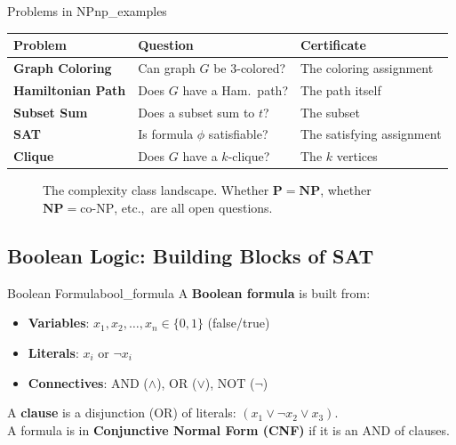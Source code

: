 \documentclass[12pt,a4paper]{article}
\newcommand{\P}{\mathbf{P}}
\newcommand{\NP}{\mathbf{NP}}
\begin{document}
\begin{example}{Problems in NP}{np_examples}
\begin{center}
\begin{tabular}{>{\bfseries}p{3.5cm} p{4.5cm} p{4cm}}
\toprule
Problem & Question & Certificate \\
\midrule
Graph Coloring & Can graph $G$ be 3-colored? & The coloring assignment \\
Hamiltonian Path & Does $G$ have a Ham.\ path? & The path itself \\
Subset Sum & Does a subset sum to $t$? & The subset \\
SAT & Is formula $\phi$ satisfiable? & The satisfying assignment \\
Clique & Does $G$ have a $k$-clique? & The $k$ vertices \\
\bottomrule
\end{tabular}
\end{center}
\end{example}

\begin{figure}[H]
\centering
{}
\caption{The complexity class landscape. Whether $\P = \NP$, whether $\NP = \text{co-NP}$, etc.,\ are all open questions.}
\end{figure}

\subsection{Boolean Logic: Building Blocks of SAT}

\begin{definition}{Boolean Formula}{bool_formula}
A \textbf{Boolean formula} is built from:
\begin{itemize}[leftmargin=2em]
  \item \textbf{Variables}: $x_1, x_2, \ldots, x_n \in \{0,1\}$ (false/true)
  \item \textbf{Literals}: $x_i$ or $\neg x_i$
  \item \textbf{Connectives}: AND ($\land$), OR ($\lor$), NOT ($\neg$)
\end{itemize}
A \textbf{clause} is a disjunction (OR) of literals: $(x_1 \lor \neg x_2 \lor x_3)$.\\
A formula is in \textbf{Conjunctive Normal Form (CNF)} if it is an AND of clauses.
\end{definition}
\end{document}
